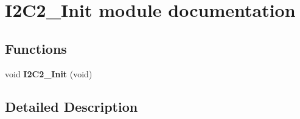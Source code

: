 \hypertarget{group___i2_c2___init__module}{}\section{I2\+C2\+\_\+\+Init module documentation}
\label{group___i2_c2___init__module}
\subsection*{Functions}
\begin{DoxyCompactItemize}
\item 
void {\bfseries I2\+C2\+\_\+\+Init} (void)\hypertarget{group___i2_c2___init__module_ga130e1efac5c34d48ed14c9d9993df490}{}\label{group___i2_c2___init__module_ga130e1efac5c34d48ed14c9d9993df490}

\end{DoxyCompactItemize}


\subsection{Detailed Description}

